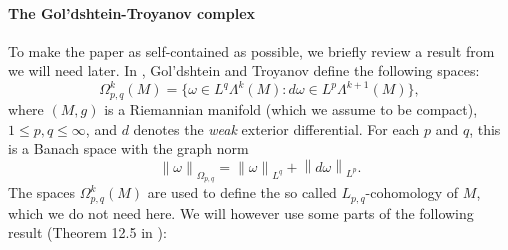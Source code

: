 \documentclass[11pt,letterpaper,reqno,abstract=true]{scrartcl}
\theoremstyle{plain}                              %
\theoremstyle{definition}                         %
\theoremstyle{remark}                             %
\providecommand{\norm}[1]{\left\lVert#1\right\rVert}       %
\begin{document}
\paragraph{The Gol'dshtein-Troyanov complex}
To make the paper as self-contained as possible, we briefly review a
result from \cite{goldshtein+troyanov+06} we will need later. In
\cite{goldshtein+troyanov+06}, Gol'dshtein and Troyanov define the
following spaces:
%
\begin{displaymath}
  \Omega^k_{p,q}(M) = \{ \omega \in L^q \Lambda^k(M) : d\omega \in L^p
  \Lambda^{k+1}(M) \},
\end{displaymath}
%
where $(M,g)$ is a Riemannian manifold (which we assume to be
compact), $1 \leq p, q \leq \infty$, and $d$ denotes the \emph{weak} exterior
differential. For each $p$ and $q$, this is a Banach space with the
graph norm
%
\begin{displaymath}
  \norm{\omega}_{\Omega_{p,q}} = \norm{\omega}_{L^q} + \norm{d\omega}_{L^p}.
\end{displaymath}
%
The spaces $\Omega^k_{p,q}(M)$ are used to define the so called
$L_{p,q}$-cohomology of $M$, which we do not need here. We will
however use some parts of the following result (Theorem 12.5 in
\cite{goldshtein+troyanov+06}):
\end{document}
